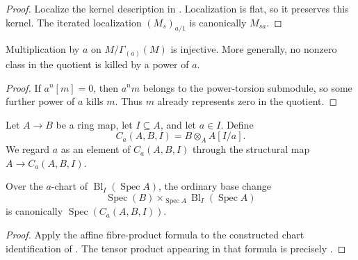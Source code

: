 \begin{proof}
  Localize the kernel description in
  .  Localization is flat,
  so it preserves this kernel.  The iterated localization $(M_s)_{a/1}$ is
  canonically $M_{sa}$.
\end{proof}

\begin{lemma}
  \label{lemma:nagata-power-torsion-quotient-torsionfree}

  Multiplication by $a$ on $M/\Gamma_{(a)}(M)$ is injective.  More generally,
  no nonzero class in the quotient is killed by a power of $a$.
\end{lemma}

\begin{proof}
  If $a^n[m]=0$, then $a^nm$ belongs to the power-torsion submodule, so some
  further power of $a$ kills $m$.  Thus $m$ already represents zero in the
  quotient.
\end{proof}

\begin{definition}
  \label{def:nagata-strict-transform-basechange-chart-ring}

  Let $A\to B$ be a ring map, let $I\subseteq A$, and let $a\in I$.
  Define
  \[
    C_a(A,B,I)=B\otimes_A A[I/a].
  \]
  We regard $a$ as an element of $C_a(A,B,I)$ through the structural map
  $A\to C_a(A,B,I)$.
\end{definition}

\begin{lemma}
  \label{lemma:nagata-strict-transform-basechange-chart}

  Over the $a$-chart of
  $\operatorname{Bl}_I(\operatorname{Spec}A)$, the ordinary base change
  \[
    \operatorname{Spec}(B)\times_{\operatorname{Spec}A}
    \operatorname{Bl}_I(\operatorname{Spec}A)
  \]
  is canonically $\operatorname{Spec}(C_a(A,B,I))$.
\end{lemma}

\begin{proof}
  Apply the affine fibre-product formula to the constructed chart
  identification of .  The tensor
  product appearing in that formula is precisely
  .
\end{proof}

